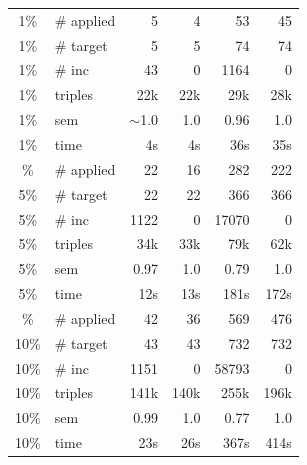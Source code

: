 \documentclass[a4paper,UKenglish,cleveref, autoref, thm-restate]{tgdk-v2021}
\begin{document}
\begin{table}[ht]
\begin{minipage}[t]{0.49\linewidth}
\begin{tabular}{c l | r r r r}
\midrule
1\% & \# applied & 5 & 4 & 53 & 45 \\
1\% & \# target & 5 & 5 & 74 & 74 \\
1\% & \# inc & 43 & 0 & 1164 & 0 \\
1\% & triples & 22k & 22k & 29k & 28k \\
1\% & sem & $\sim$1.0 & 1.0 & 0.96 & 1.0 \\
1\% & time & 4s & 4s & 36s & 35s \\
\addlinespace
5\% & \# applied & 22 & 16 & 282 & 222 \\
5\% & \# target & 22 & 22 & 366 & 366 \\
5\% & \# inc & 1122 & 0 & 17070 & 0 \\
5\% & triples & 34k & 33k & 79k & 62k \\
5\% & sem & 0.97 & 1.0 & 0.79 & 1.0 \\
5\% & time & 12s & 13s & 181s & 172s \\
\addlinespace
10\% & \# applied & 42 & 36 & 569 & 476 \\
10\% & \# target & 43 & 43 & 732 & 732 \\
10\% & \# inc & 1151 & 0 & 58793 & 0 \\
10\% & triples & 141k & 140k & 255k & 196k \\
10\% & sem & 0.99 & 1.0 & 0.77 & 1.0 \\
10\% & time & 23s & 26s & 367s & 414s \\
\bottomrule
\end{tabular}
\end{minipage}\\[2ex]


\end{table}
\end{document}
